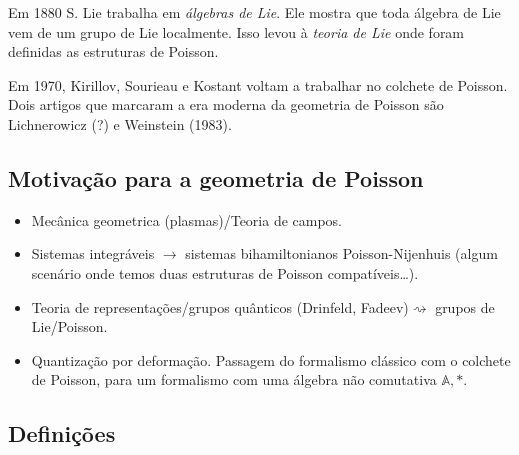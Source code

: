 Em 1880 S. Lie trabalha em \textit{álgebras de Lie}. Ele mostra que toda álgebra de Lie vem de um grupo de Lie localmente. Isso levou à \textit{teoria de Lie} onde foram definidas as estruturas de Poisson.

Em 1970, Kirillov, Sourieau e Kostant voltam a trabalhar no colchete de Poisson. Dois artigos que marcaram a era moderna da geometria de Poisson são Lichnerowicz (?) e Weinstein (1983).

\subsection{Motivação para a geometria de Poisson}

\begin{itemize}
\item Mecânica geometrica (plasmas)/Teoria de campos.
\item Sistemas integráveis \(\to\) sistemas bihamiltonianos Poisson-Nijenhuis (algum scenário onde temos duas estruturas de Poisson compatíveis…).
\item Teoria de representações/grupos quânticos (Drinfeld, Fadeev)\(\rightsquigarrow \) grupos de Lie/Poisson.
\item Quantização por deformação. Passagem do formalismo clássico com o colchete de Poisson, para um formalismo com uma álgebra não comutativa \(\mathbb{A},*\).
\end{itemize}

\subsection{Definições}


